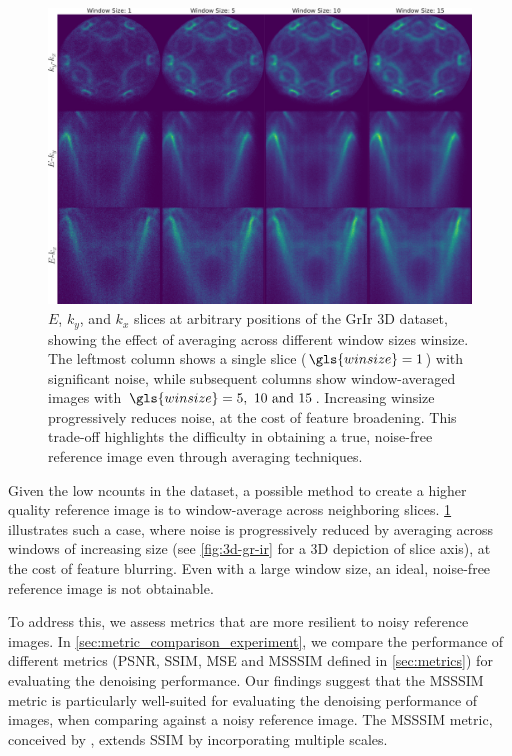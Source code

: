 \begin{figure}
    \centering
    \includegraphics[width=1\linewidth]{images/slices.pdf}
    \caption{$E$, $k_y$, and $k_x$ slices at arbitrary positions of the \gls{GrIr} 3D dataset, showing the effect of averaging across different window sizes \gls{winsize}. The leftmost column shows a single slice ($\gls{winsize}=1$) with significant noise, while subsequent columns show window-averaged images with $\gls{winsize}=\numlist{5;10;15}$. Increasing \gls{winsize} progressively reduces noise, at the cost of feature broadening. This trade-off highlights the difficulty in obtaining a true, noise-free reference image even through averaging techniques.}
    \label{fig:slices}
\end{figure}

Given the low \gls{ncounts} in the dataset, a possible method to create a higher quality reference image is to window-average across neighboring slices. \cref{fig:slices} illustrates such a case, where noise is progressively reduced by averaging across windows of increasing size (see \cref{fig:3d-gr-ir} for a 3D depiction of slice axis), at the cost of feature blurring. Even with a large window size, an ideal, noise-free reference image is not obtainable.

To address this, we assess metrics that are more resilient to noisy reference images. In \cref{sec:metric_comparison_experiment}, we compare the performance of different metrics (\gls{PSNR}, \gls{SSIM}, \gls{MSE} and \gls{MSSSIM} defined in \cref{sec:metrics}) for evaluating the denoising performance. Our findings suggest that the \gls{MSSSIM} metric is particularly well-suited for evaluating the denoising performance of images, when comparing against a noisy reference image. The \gls{MSSSIM} metric, conceived by \citeauthor{wangMultiscaleStructuralSimilarity2003} \cite{wangMultiscaleStructuralSimilarity2003}, extends SSIM by incorporating multiple scales. 

